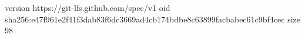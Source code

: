 version https://git-lfs.github.com/spec/v1
oid sha256:e47f961e2f41f3dab83f6dc3669ad4cb174bdbe8c63899facbabec61c9bf4cec
size 98
